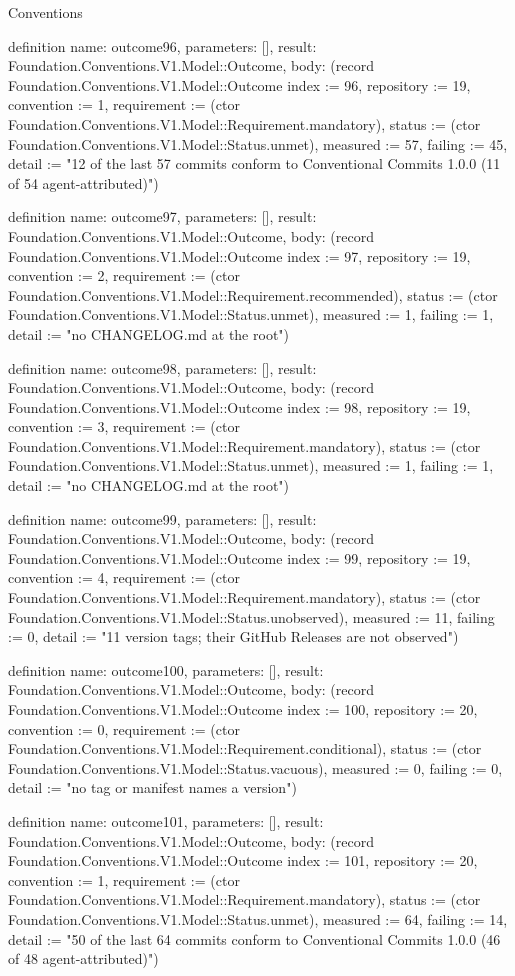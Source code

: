 \begin{lexlean}{Conventions}
\begin{semanticmodule}
definition{
  name: outcome96,
  parameters: [],
  result: Foundation.Conventions.V1.Model::Outcome,
  body: (record Foundation.Conventions.V1.Model::Outcome {index := 96, repository := 19, convention := 1, requirement := (ctor Foundation.Conventions.V1.Model::Requirement.mandatory), status := (ctor Foundation.Conventions.V1.Model::Status.unmet), measured := 57, failing := 45, detail := "12 of the last 57 commits conform to Conventional Commits 1.0.0 (11 of 54 agent-attributed)"})
}

definition{
  name: outcome97,
  parameters: [],
  result: Foundation.Conventions.V1.Model::Outcome,
  body: (record Foundation.Conventions.V1.Model::Outcome {index := 97, repository := 19, convention := 2, requirement := (ctor Foundation.Conventions.V1.Model::Requirement.recommended), status := (ctor Foundation.Conventions.V1.Model::Status.unmet), measured := 1, failing := 1, detail := "no CHANGELOG.md at the root"})
}

definition{
  name: outcome98,
  parameters: [],
  result: Foundation.Conventions.V1.Model::Outcome,
  body: (record Foundation.Conventions.V1.Model::Outcome {index := 98, repository := 19, convention := 3, requirement := (ctor Foundation.Conventions.V1.Model::Requirement.mandatory), status := (ctor Foundation.Conventions.V1.Model::Status.unmet), measured := 1, failing := 1, detail := "no CHANGELOG.md at the root"})
}

definition{
  name: outcome99,
  parameters: [],
  result: Foundation.Conventions.V1.Model::Outcome,
  body: (record Foundation.Conventions.V1.Model::Outcome {index := 99, repository := 19, convention := 4, requirement := (ctor Foundation.Conventions.V1.Model::Requirement.mandatory), status := (ctor Foundation.Conventions.V1.Model::Status.unobserved), measured := 11, failing := 0, detail := "11 version tags; their GitHub Releases are not observed"})
}

definition{
  name: outcome100,
  parameters: [],
  result: Foundation.Conventions.V1.Model::Outcome,
  body: (record Foundation.Conventions.V1.Model::Outcome {index := 100, repository := 20, convention := 0, requirement := (ctor Foundation.Conventions.V1.Model::Requirement.conditional), status := (ctor Foundation.Conventions.V1.Model::Status.vacuous), measured := 0, failing := 0, detail := "no tag or manifest names a version"})
}

definition{
  name: outcome101,
  parameters: [],
  result: Foundation.Conventions.V1.Model::Outcome,
  body: (record Foundation.Conventions.V1.Model::Outcome {index := 101, repository := 20, convention := 1, requirement := (ctor Foundation.Conventions.V1.Model::Requirement.mandatory), status := (ctor Foundation.Conventions.V1.Model::Status.unmet), measured := 64, failing := 14, detail := "50 of the last 64 commits conform to Conventional Commits 1.0.0 (46 of 48 agent-attributed)"})
}


\end{semanticmodule}
\end{lexlean}
